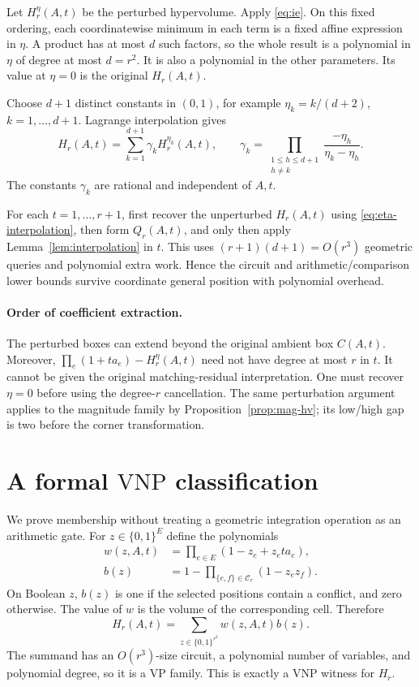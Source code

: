 \documentclass[12pt,a4paper]{article}
\theoremstyle{definition}
\theoremstyle{remark}
\newcommand{\VP}{\mathrm{VP}}
\newcommand{\VNP}{\mathrm{VNP}}
\newcommand{\conf}{\mathcal C_r}
\begin{document}
Let $H_r^\eta(A,t)$ be the perturbed hypervolume. Apply
\eqref{eq:ie}. On this fixed ordering, each coordinatewise minimum in
each term is a fixed affine expression in $\eta$. A product has at most
$d$ such factors, so the whole result is a polynomial in $\eta$ of
degree at most $d=r^2$. It is also a polynomial in the other parameters.
Its value at $\eta=0$ is the original $H_r(A,t)$.

Choose $d+1$ distinct constants in $(0,1)$, for example
$\eta_k=k/(d+2)$, $k=1,\ldots,d+1$. Lagrange interpolation gives
\begin{equation}
 H_r(A,t)=\sum_{k=1}^{d+1}\gamma_k H_r^{\eta_k}(A,t),
 \qquad
 \gamma_k=\prod_{\substack{1\le h\le d+1\\h\ne k}}
             \frac{-\eta_h}{\eta_k-\eta_h}.
 \label{eq:eta-interpolation}
\end{equation}
The constants $\gamma_k$ are rational and independent of $A,t$.

For each $t=1,\ldots,r+1$, first recover the unperturbed $H_r(A,t)$
using \eqref{eq:eta-interpolation}, then form $Q_r(A,t)$, and only then
apply Lemma~\ref{lem:interpolation} in $t$. This uses
$(r+1)(d+1)=O(r^3)$ geometric queries and polynomial extra work. Hence
the circuit and arithmetic/comparison lower bounds survive coordinate
general position with polynomial overhead.

\paragraph{Order of coefficient extraction.}
The perturbed boxes can extend beyond the original ambient box
$C(A,t)$. Moreover,
$\prod_e(1+ta_e)-H_r^\eta(A,t)$ need not have degree at most $r$ in
$t$. It cannot be given the original matching-residual interpretation.
One must recover $\eta=0$ before using the degree-$r$ cancellation.
The same perturbation argument applies to the magnitude family by
Proposition~\ref{prop:mag-hv}; its low/high gap is two before the corner
transformation.

\section{A formal \texorpdfstring{$\VNP$}{VNP} classification}
\label{app:vnp}

We prove membership without treating a geometric integration operation
as an arithmetic gate. For $z\in\{0,1\}^{E}$ define the polynomials
\begin{align*}
 w(z,A,t)&=\prod_{e\in E}(1-z_e+z_e ta_e),\\
 b(z)&=1-\prod_{\{e,f\}\in\conf}(1-z_ez_f).
\end{align*}
On Boolean $z$, $b(z)$ is one if the selected positions contain a
conflict, and zero otherwise. The value of $w$ is the volume of the
corresponding cell. Therefore
\begin{equation}
 H_r(A,t)=\sum_{z\in\{0,1\}^{r^2}}w(z,A,t)b(z).
 \label{eq:vnp-witness}
\end{equation}
The summand has an $O(r^3)$-size circuit, a polynomial number of
variables, and polynomial degree, so it is a $\VP$ family. This is
exactly a $\VNP$ witness for $H_r$.
\end{document}
